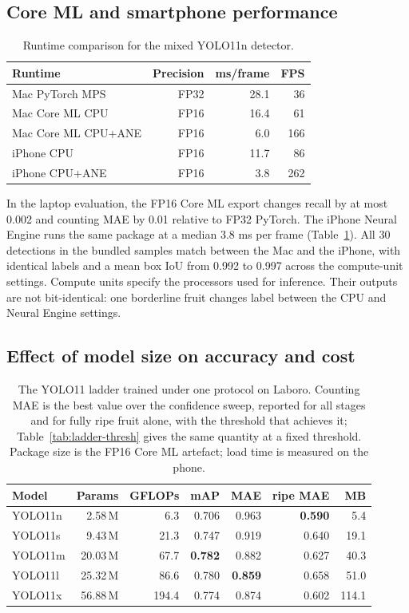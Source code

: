 \subsection{Core ML and smartphone performance}

\begin{table}[t]
\caption{Runtime comparison for the mixed YOLO11n detector.}
\label{tab:runtime}
\centering
\begin{tabular}{lrrr}
\toprule
Runtime & Precision & ms/frame & FPS \\
\midrule
Mac PyTorch MPS & FP32 & 28.1 & 36 \\
Mac Core ML CPU & FP16 & 16.4 & 61 \\
Mac Core ML CPU+ANE & FP16 & 6.0 & 166 \\
iPhone CPU & FP16 & 11.7 & 86 \\
iPhone CPU+ANE & FP16 & 3.8 & 262 \\
\bottomrule
\end{tabular}
\end{table}

In the laptop evaluation, the FP16 Core ML export changes recall by at most
0.002 and counting MAE by 0.01 relative to FP32 PyTorch. The iPhone Neural
Engine runs the same package at a median 3.8 ms per frame
(Table~\ref{tab:runtime}). All 30 detections in the bundled samples match
between the Mac and the iPhone, with identical labels and a mean box IoU from
0.992 to 0.997 across the compute-unit settings. Compute units specify the
processors used for inference. Their outputs are not bit-identical: one
borderline fruit changes label between the CPU and Neural Engine settings.

\subsection{Effect of model size on accuracy and cost}
\label{sec:ladder}

\begin{table}[t]
\caption{The YOLO11 ladder trained under one protocol on Laboro. Counting MAE
is the best value over the confidence sweep, reported for all stages and for
fully ripe fruit alone, with the threshold that achieves it;
Table~\ref{tab:ladder-thresh} gives the same quantity at a fixed threshold.
Package size is
the FP16 Core ML artefact; load time is measured on the phone.}
\label{tab:ladder}
\centering
\begin{tabular}{lrrrrrr}
\toprule
Model & Params & GFLOPs & mAP & MAE & ripe MAE & MB \\
\midrule
YOLO11n & 2.58\,M & 6.3 & 0.706 & 0.963 & \textbf{0.590} & 5.4 \\
YOLO11s & 9.43\,M & 21.3 & 0.747 & 0.919 & 0.640 & 19.1 \\
YOLO11m & 20.03\,M & 67.7 & \textbf{0.782} & 0.882 & 0.627 & 40.3 \\
YOLO11l & 25.32\,M & 86.6 & 0.780 & \textbf{0.859} & 0.658 & 51.0 \\
YOLO11x & 56.88\,M & 194.4 & 0.774 & 0.874 & 0.602 & 114.1 \\
\bottomrule
\end{tabular}
\end{table}

